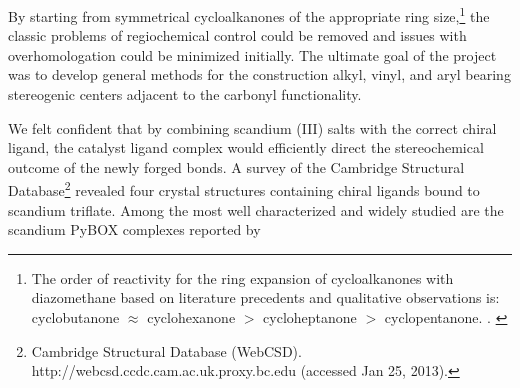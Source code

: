 By starting from symmetrical cycloalkanones of the appropriate ring size,\footnote{The
 order of reactivity for the ring expansion of cycloalkanones with diazomethane based on literature
 precedents and qualitative observations is: cyclobutanone $\approx$ cyclohexanone $>$
 cycloheptanone $>$ cyclopentanone. . \label{ref:asgutscherev}} the classic
problems of regiochemical control could be removed and issues with overhomologation could be
minimized initially.
The ultimate goal of the project was to develop general methods for the construction alkyl, vinyl, and aryl
 bearing stereogenic centers adjacent to the carbonyl functionality.

 
%  
 We felt confident that by combining scandium (III) salts with the correct chiral ligand, the
 catalyst ligand complex would efficiently direct the stereochemical outcome of the newly forged
  bonds. A survey of the Cambridge Structural Database\footnote{{\frenchspacing
 Cambridge Structural Database (WebCSD). http://webcsd.ccdc.cam.ac.uk.proxy.bc.edu (accessed Jan 25, 2013).}} revealed
 four crystal structures containing chiral ligands bound to scandium triflate.
 Among the most well characterized and widely studied are the scandium PyBOX complexes reported by
